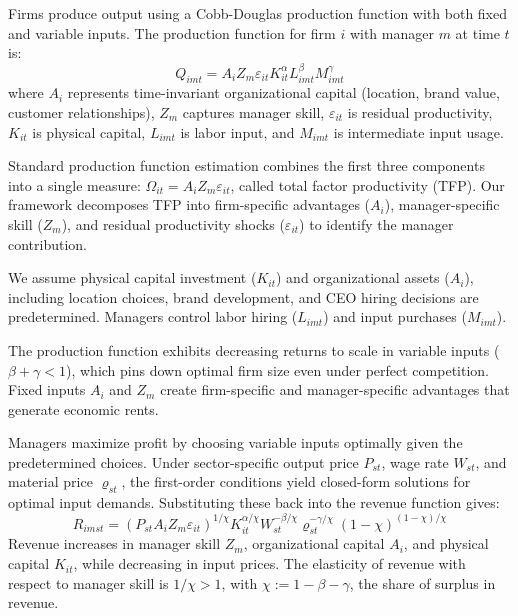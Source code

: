 \documentclass[11pt,a4paper]{article}
\begin{document}
Firms produce output using a Cobb-Douglas production function with both fixed and variable inputs. The production function for firm $i$ with manager $m$ at time $t$ is:
\begin{equation}\label{eq:production}
Q_{imt} = A_i Z_{m} \varepsilon_{it} K_{it}^\alpha L_{imt}^{\beta} M_{imt}^{\gamma}
\end{equation}
where $A_i$ represents time-invariant organizational capital (location, brand value, customer relationships), $Z_m$ captures manager skill, $\varepsilon_{it}$ is residual productivity, $K_{it}$ is physical capital, $L_{imt}$ is labor input, and $M_{imt}$ is intermediate input usage. 

Standard production function estimation combines the first three components into a single measure: $\Omega_{it} = A_i Z_m \varepsilon_{it}$, called total factor productivity (TFP). Our framework decomposes TFP into firm-specific advantages ($A_i$), manager-specific skill ($Z_m$), and residual productivity shocks ($\varepsilon_{it}$) to identify the manager contribution.

We assume physical capital investment ($K_{it}$) and organizational assets ($A_i$), including location choices, brand development, and CEO hiring decisions are predetermined. Managers control labor hiring ($L_{imt}$) and input purchases ($M_{imt}$). 

The production function exhibits decreasing returns to scale in variable inputs ($\beta + \gamma < 1$), which pins down optimal firm size even under perfect competition. Fixed inputs $A_i$ and $Z_m$ create firm-specific and manager-specific advantages that generate economic rents.

Managers maximize profit by choosing variable inputs optimally given the predetermined choices. Under sector-specific output price $P_{st}$, wage rate $W_{st}$, and material price $\varrho_{st}$, the first-order conditions yield closed-form solutions for optimal input demands. Substituting these back into the revenue function gives:
\begin{equation}\label{eq:revenue}
R_{imst} = (P_{st}A_i Z_m \varepsilon_{it})^{1/\chi}
K_{it}^{\alpha/\chi}
W_{st}^{-\beta/\chi}
\varrho_{st}^{-\gamma/\chi}
(1-\chi)^{(1-\chi)/\chi}
\end{equation}
Revenue increases in manager skill $Z_m$, organizational capital $A_i$, and physical capital $K_{it}$, while decreasing in input prices. The elasticity of revenue with respect to manager skill is $1/\chi > 1$, with $\chi := 1 - \beta - \gamma$, the share of surplus in revenue. 
\end{document}
